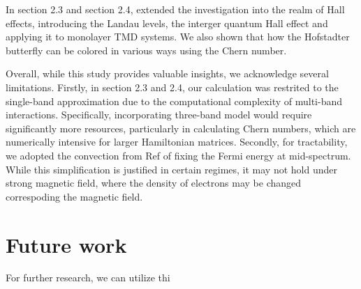 \documentclass{report}
\begin{document}
In section 2.3 and section 2.4, extended the investigation into the realm of Hall effects, introducing the Landau levels, the interger quantum Hall effect and applying it to monolayer TMD systems. We also shown that how the Hofstadter butterfly can be colored in various ways using the Chern number.

Overall, while this study provides valuable insights, we acknowledge several limitations. Firstly, in section 2.3 and 2.4, our calculation was restrited to the single-band approximation due to the computational complexity of multi-band interactions. Specifically, incorporating three-band model would require significantly more resources, particularly in calculating Chern numbers, which are numerically intensive for larger Hamiltonian matrices. Secondly, for tractability, we adopted the convection from  Ref \cite{klitzing90} of fixing the Fermi energy at mid-spectrum. While this simplification is justified in certain regimes, it may not hold under strong magnetic field, where the density of electrons may be changed correspoding the magnetic field.
\section{Future work}
For further research, we can utilize thi




\appendix
\renewcommand{\chaptername}{Appendix}
\end{document}
